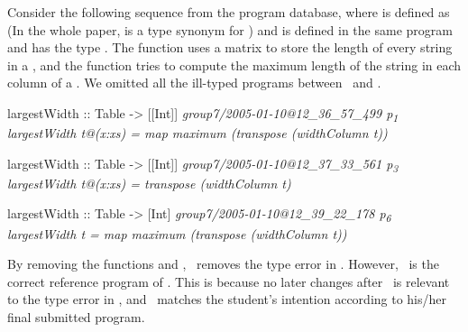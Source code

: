 \documentclass[12pt]{report}	%
\begin{document}
Consider the following sequence from the program database,
where 
 is defined as \prog{[[String]]} (In the whole
paper,  is a type synonym for \prog{[[String]]})
and  is defined in the same program
and has the type .
%
The function  uses a matrix to store the length of 
every string in a ,
and the function  tries to compute the maximum
length of the string in each column of a .
We omitted all the ill-typed programs between \pga\ and \pgc.
%
%
\begin{program}
largestWidth :: Table -> [[Int]]  \hfill \it{group7/2005-01-10@12_36_57_499 \quad p\textsubscript{1}}
largestWidth t@(x:xs) = map maximum (transpose (widthColumn t))

largestWidth :: Table -> [[Int]] \hfill \it{group7/2005-01-10@12_37_33_561 \quad p\textsubscript{3}}
largestWidth t@(x:xs) = transpose (widthColumn t)

largestWidth :: Table -> [Int] \hfill \it{group7/2005-01-10@12_39_22_178 \quad p\textsubscript{6}}
largestWidth t  = map maximum (transpose (widthColumn t))
\end{program}
%
%
%
By removing the functions  and ,
\pgb\ removes the type error in \pga. However,
\pgc\ is the correct reference program of \pga.
This is because no later changes after \pgc\ is relevant
to the type error in \pga, and
\pgc\ matches the student's intention according to
his/her final submitted program.
\end{document}

